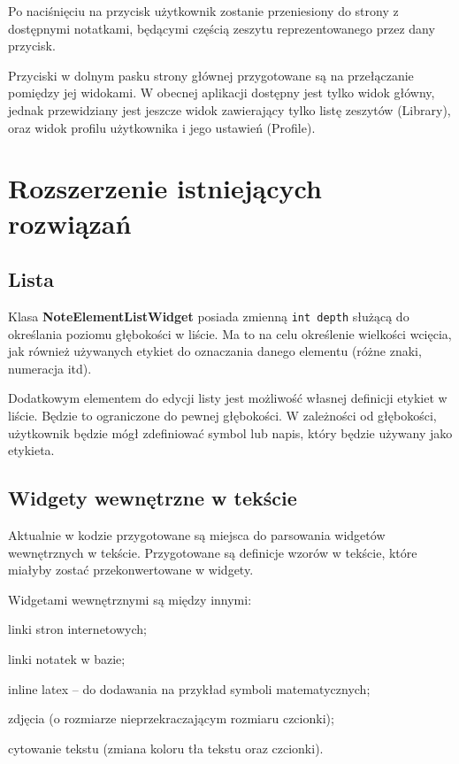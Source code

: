 Po naciśnięciu na przycisk użytkownik zostanie przeniesiony do strony z dostępnymi notatkami, będącymi częścią zeszytu reprezentowanego przez dany przycisk.

Przyciski w dolnym pasku strony głównej przygotowane są na przełączanie pomiędzy jej widokami. W obecnej aplikacji dostępny jest tylko widok główny, jednak przewidziany jest jeszcze widok zawierający tylko listę zeszytów (Library), oraz widok profilu użytkownika i jego ustawień (Profile).

\section{Rozszerzenie istniejących rozwiązań}

\subsection{Lista}

Klasa \textbf{NoteElementListWidget} posiada zmienną \verb|int depth| służącą do określania poziomu głębokości w liście. Ma to na celu określenie wielkości wcięcia, jak również używanych etykiet do oznaczania danego elementu (różne znaki, numeracja itd).

Dodatkowym elementem do edycji listy jest możliwość własnej definicji etykiet w liście. Będzie to ograniczone do pewnej głębokości. W zależności od głębokości, użytkownik będzie mógł zdefiniować symbol lub napis, który będzie używany jako etykieta.

\subsection{Widgety wewnętrzne w tekście}

Aktualnie w kodzie przygotowane są miejsca do parsowania widgetów wewnętrznych w tekście. Przygotowane są definicje wzorów w tekście, które miałyby zostać przekonwertowane w widgety.

Widgetami wewnętrznymi są między innymi:

\begin{compactitem}
    \item linki stron internetowych;
    \item linki notatek w bazie;
    \item inline latex -- do dodawania na przykład symboli matematycznych;
    \item zdjęcia (o rozmiarze nieprzekraczającym rozmiaru czcionki);
    \item cytowanie tekstu (zmiana koloru tła tekstu oraz czcionki).
\end{compactitem}

